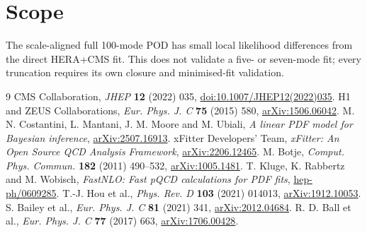 \documentclass[11pt]{article}
\begin{document}
\section{Scope}
The scale-aligned full 100-mode POD has small local likelihood differences from the direct HERA+CMS fit. This does not validate a five- or seven-mode fit; every truncation requires its own closure and minimised-fit validation.
\begin{thebibliography}{9}
 CMS Collaboration, \emph{JHEP} \textbf{12} (2022) 035, \href{https://doi.org/10.1007/JHEP12(2022)035}{doi:10.1007/JHEP12(2022)035}.
 H1 and ZEUS Collaborations, \emph{Eur. Phys. J. C} \textbf{75} (2015) 580, \href{https://arxiv.org/abs/1506.06042}{arXiv:1506.06042}.
 M. N. Costantini, L. Mantani, J. M. Moore and M. Ubiali, \emph{A linear PDF model for Bayesian inference}, \href{https://arxiv.org/abs/2507.16913}{arXiv:2507.16913}.
 xFitter Developers' Team, \emph{xFitter: An Open Source QCD Analysis Framework}, \href{https://arxiv.org/abs/2206.12465}{arXiv:2206.12465}.
 M. Botje, \emph{Comput. Phys. Commun.} \textbf{182} (2011) 490--532, \href{https://arxiv.org/abs/1005.1481}{arXiv:1005.1481}.
 T. Kluge, K. Rabbertz and M. Wobisch, \emph{FastNLO: Fast pQCD calculations for PDF fits}, \href{https://arxiv.org/abs/hep-ph/0609285}{hep-ph/0609285}.
 T.-J. Hou et al., \emph{Phys. Rev. D} \textbf{103} (2021) 014013, \href{https://arxiv.org/abs/1912.10053}{arXiv:1912.10053}.
 S. Bailey et al., \emph{Eur. Phys. J. C} \textbf{81} (2021) 341, \href{https://arxiv.org/abs/2012.04684}{arXiv:2012.04684}.
 R. D. Ball et al., \emph{Eur. Phys. J. C} \textbf{77} (2017) 663, \href{https://arxiv.org/abs/1706.00428}{arXiv:1706.00428}.
\end{thebibliography}
\end{document}
